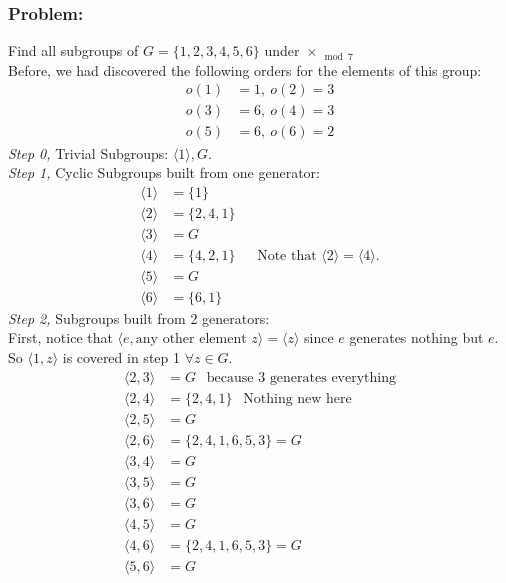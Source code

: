 \subsubsection{Problem:} Find all subgroups of $G=\{1,2,3,4,5,6\}$ under $\times_{\mod 7}$\\
Before, we had discovered the following orders for the elements of this group:
\begin{align}
    o(1)&=1, \ o(2)=3 \nonumber \\
    o(3)&=6, \ o(4)=3 \nonumber \\
    o(5)&=6, \ o(6)=2 \nonumber 
\end{align}
\textit{Step 0,} Trivial Subgroups: $\langle 1 \rangle , G$.\\
\textit{Step 1,} Cyclic Subgroups built from one generator: 
\begin{align}
    \langle 1 \rangle &= \{1\} \nonumber \\
    \langle 2 \rangle &= \{2,4,1\} \nonumber \\
    \langle 3 \rangle &= G \nonumber \\
    \langle 4 \rangle &= \{4,2,1\}  \ \ \ \ \ \ \ \text{Note that $\langle 2 \rangle=\langle 4 \rangle$.}\nonumber \\
    \langle 5 \rangle &= G \nonumber \\
    \langle 6 \rangle &= \{6,1\} \nonumber
\end{align}
\textit{Step 2,} Subgroups built from 2 generators:\\
First, notice that $\langle e, \text{any other element } z\rangle = \langle z\rangle$ since $e$ generates nothing but $e$. So $\langle 1, z\rangle$ is covered in step 1 $\forall z\in G$.
\begin{align}
    \langle 2,3 \rangle &= G \ \ \text{ because } 3 \text{ generates everything} \nonumber \\
    \langle 2,4 \rangle &= \{2,4,1\} \ \ \text{ Nothing new here} \nonumber \\
    \langle 2,5 \rangle &= G \nonumber \\
    \langle 2,6 \rangle &= \{2,4,1,6,5,3\}= G  \nonumber \\
    \langle 3,4 \rangle &= G \nonumber \\
    \langle 3,5 \rangle &= G \nonumber \\
    \langle 3,6 \rangle &= G \nonumber \\
    \langle 4,5 \rangle &= G \nonumber \\
    \langle 4,6 \rangle &= \{2,4,1,6,5,3\}= G \nonumber \\
    \langle 5,6 \rangle &= G \nonumber 
\end{align}
